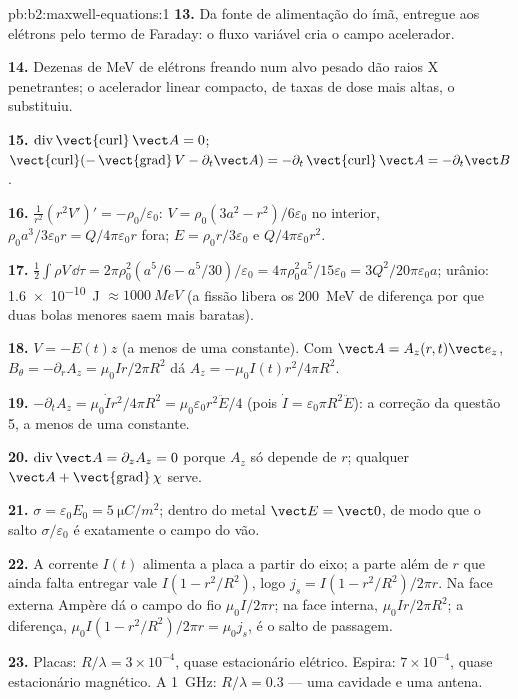 \begin{solution}{pb:b2:maxwell-equations:1}
\textbf{13.} Da fonte de alimentação do ímã, entregue aos elétrons pelo
termo de Faraday: o fluxo variável cria o campo acelerador.

\textbf{14.} Dezenas de MeV de elétrons freando num alvo pesado dão
raios X penetrantes; o acelerador linear compacto, de taxas de dose
mais altas, o substituiu.

\textbf{15.} $\operatorname{div}\operatorname{\vect{curl}}\vect A = 0$; $\operatorname{\vect{curl}}(-\operatorname{\vect{grad}}
V - \partial_t\vect A) = -\partial_t\operatorname{\vect{curl}}\vect A = -\partial_t\vect B$.

\textbf{16.} $\frac1{r^2}(r^2V')' = -\rho_0/\varepsilon_0$: $V = \rho_0(3a^2 - r^2)/6\varepsilon_0$
no interior, $\rho_0a^3/3\varepsilon_0r = Q/4\pi\varepsilon_0r$ fora; $E = \rho_0r/3\varepsilon_0$ e
$Q/4\pi\varepsilon_0r^2$.

\textbf{17.} $\tfrac12\int\rho V\,\dd\tau = 2\pi\rho_0^2(a^5/6 - a^5/30)/\varepsilon_0 = 4\pi\rho_0^2a^5/
15\varepsilon_0 = 3Q^2/20\pi\varepsilon_0a$; urânio: \qty{1.6e-10}{J} $\approx \qty{1000}{MeV}$ (a fissão
libera os \qty{200}{MeV} de diferença por que duas bolas menores saem mais baratas).

\textbf{18.} $V = -E(t)z$ (a menos de uma constante). Com $\vect A = A_z(r, t)\vect e_z$,
$B_\theta = -\partial_rA_z = \mu_0Ir/2\pi R^2$ dá $A_z = -\mu_0I(t)r^2/4\pi R^2$.

\textbf{19.} $-\partial_tA_z = \mu_0\dot Ir^2/4\pi R^2 = \mu_0\varepsilon_0r^2\ddot E/4$ (pois $\dot I =
\varepsilon_0\pi R^2\ddot E$): a correção da questão 5, a menos de uma constante.

\textbf{20.} $\operatorname{div}\vect A = \partial_zA_z = 0$ porque $A_z$ só depende de $r$;
qualquer $\vect A + \operatorname{\vect{grad}}\chi$ serve.

\textbf{21.} $\sigma = \varepsilon_0E_0 = \qty{5}{\micro C/m^2}$; dentro do metal $\vect E =
\vect 0$, de modo que o salto $\sigma/\varepsilon_0$ é exatamente o campo do vão.

\textbf{22.} A corrente $I(t)$ alimenta a placa a partir do eixo; a
parte além de $r$ que ainda falta entregar vale $I(1 - r^2/R^2)$, logo $j_s = I(1 -
r^2/R^2)/2\pi r$. Na face externa Ampère dá o campo do fio $\mu_0I/
2\pi r$; na face interna, $\mu_0Ir/2\pi R^2$; a diferença, $\mu_0I(1 -
r^2/R^2)/2\pi r = \mu_0j_s$, é o salto de passagem.

\textbf{23.} Placas: $R/\lambda = 3 \times 10^{-4}$, quase estacionário elétrico. Espira: $7 \times 10^{-4}$,
quase estacionário magnético. A \qty{1}{GHz}: $R/\lambda = 0.3$ --- uma cavidade e uma antena.


\end{solution}
